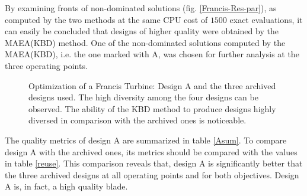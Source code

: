 By examining fronts of non-dominated solutions (fig. \ref{Francis-Res-par}), as computed by the two methods at the same CPU cost of $1500$ exact evaluations, it can easily be concluded that designs of higher quality were obtained by the MAEA(KBD) method. 
One of the non-dominated solutions computed by the MAEA(KBD), i.e. the one marked with A, was chosen for further analysis at the three operating points.


\begin{figure}[h!]
\begin{minipage}[b]{1\linewidth}
 \centering
\end{minipage}
\caption{Optimization of a Francis Turbine: Design A and the three archived designs used. The high diversity among the four designs can be observed. The ability of the KBD method to produce designs highly diversed in comparison with the archived ones is noticeable.}
\label{design-bases-a}
\end{figure}

The quality metrics of design A are summarized in table \ref{Asum}. To compare design A with the archived ones, its metrics should be compared with the values in table \ref{reuse}. This comparison reveals that, design A is significantly better that the three archived designs at all operating points and for both objectives. Design A is, in fact, a high quality blade.


